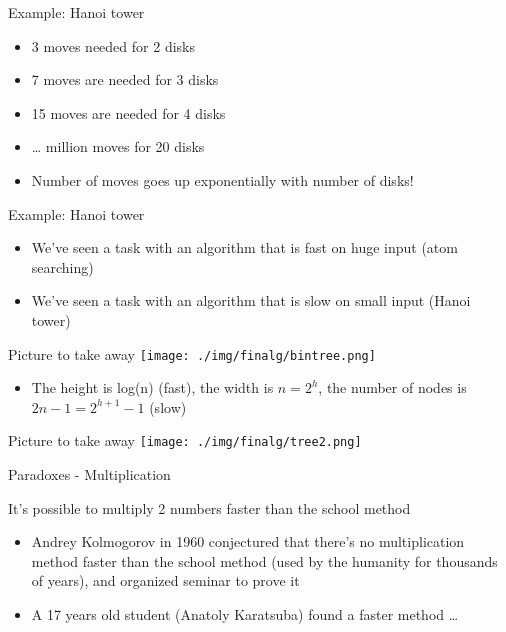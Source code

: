 \documentclass[presentation]{beamer}
\begin{document}
\begin{frame}[label=sec-2-5]{Example: Hanoi tower}
\begin{itemize}
\item 3 moves needed for 2 disks
\item 7 moves are needed for 3 disks
\item 15 moves are needed for 4 disks
\item \ldots{} million moves for 20 disks
\item Number of moves goes up exponentially with number of disks!
\end{itemize}
\end{frame}
\begin{frame}[label=sec-2-6]{Example: Hanoi tower}
\begin{itemize}
\item We've seen a task with an algorithm that is fast on huge input (atom searching)
\item We've seen a task with an algorithm that is slow on small input (Hanoi tower)
\end{itemize}
\end{frame}
\begin{frame}[label=sec-2-7]{Picture to take away}
\texttt{[image: ./img/finalg/bintree.png]}
\begin{itemize}
\item The height is \alert{log(n)} (fast), the width is \alert{$n=2^h$}, the number of nodes is \alert{$2n - 1 = 2^{h+1} - 1$} (slow)
\end{itemize}
\end{frame}
\begin{frame}[label=sec-2-8]{Picture to take away}
\texttt{[image: ./img/finalg/tree2.png]}
\end{frame}
\begin{frame}[label=sec-2-9]{Paradoxes - Multiplication}
\begin{block}{It's possible to multiply 2 numbers faster than the school method}
\begin{itemize}
\item Andrey Kolmogorov in 1960 conjectured that there's no multiplication method faster than the school method (used by the humanity for thousands of years), and organized seminar to prove it
\item A 17 years old student (Anatoly Karatsuba) found a faster method \ldots{}
\end{itemize}
\end{block}
\end{frame}
\end{document}
